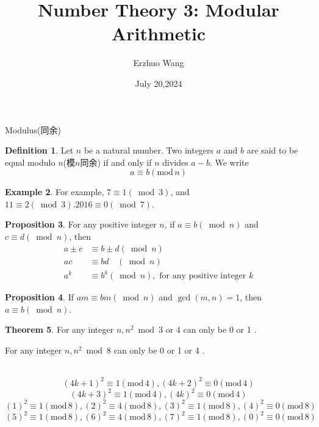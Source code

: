 \documentclass{beamer}
\title{Number Theory 3: Modular Arithmetic}
\institute{Youth STEM Academy}
\author{Erzhuo Wang}
\date{July 20,2024}
\theoremstyle{definition}
\newtheorem{defn}{Definition}[section]
\newtheorem{theo}[defn]{Theorem}
\newtheorem{prop}[defn]{Proposition}
\newtheorem{exam}[defn]{Example}
\newenvironment{prooff}{{\noindent\it\textcolor{cyan!40!black}{Proof}:}\,}{\par}
\renewcommand{\mod}[1]{(\text{mod}\,#1)}
\begin{document}
\begin{frame}
    \titlepage
\end{frame}
\begin{frame}{Modulus(同余)}
    \begin{defn}
        Let $n$ be a natural number. Two integers $a$ and $b$ are said to be equal modulo $n$(模$n$同余) if and only if $n$ divides $a-b$. We write
        $$
            a \equiv b \mod{n}
        $$
    \end{defn}
    \begin{exam}
        For example, $7 \equiv 1(\bmod 3)$, and $11 \equiv 2(\bmod 3) .2016 \equiv 0(\bmod 7)$.
    \end{exam}
\end{frame}
\begin{frame}
    \begin{prop}
        For any positive integer $n$, if $a \equiv b(\bmod n)$ and $c \equiv d(\bmod n)$, then
        $$
            \begin{aligned}
                a \pm c & \equiv b \pm d(\bmod n)                                   \\
                a c     & \equiv b d \quad(\bmod n)                                 \\
                a^k     & \equiv b^k(\bmod n), \text { for any positive integer } k
            \end{aligned}
        $$
    \end{prop}
    \begin{prop}
        If $a m \equiv b m(\bmod n)$ and $\gcd(m,n)=1$, then $a \equiv b(\bmod n)$.
    \end{prop}
\end{frame}
\begin{frame}
    \begin{theo}
        For any integer $n, n^2 \bmod 3$ or 4 can only be 0 or 1 .

        For any integer $n, n^2 \bmod 8$ can only be 0 or 1 or 4 .
    \end{theo}
    \begin{prooff}
        \begin{equation*}
            (4k+1)^2\equiv 1\mod{4}, (4k+2)^2\equiv 0\mod{4}
        \end{equation*}
        \begin{equation*}
            (4k+3)^2\equiv 1\mod{4}, (4k)^2\equiv 0\mod{4}
        \end{equation*}
        \begin{equation*}
            (1)^2\equiv 1\mod{8}, (2)^2\equiv 4\mod{8}, (3)^2\equiv 1\mod{8}, (4)^2\equiv 0\mod{8}
        \end{equation*}
        \begin{equation*}
            (5)^2\equiv 1\mod{8}, (6)^2\equiv 4\mod{8}, (7)^2\equiv 1\mod{8}, (0)^2\equiv 0\mod{8}
        \end{equation*}
    \end{prooff}
\end{frame}
\end{document}
